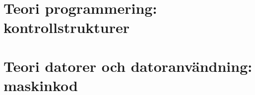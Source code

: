 
\renewcommand{\vecka}{2}


\clearpage\section{Teori programmering: kontrollstrukturer}


\clearpage\section{Teori datorer och datoranvändning: maskinkod}




